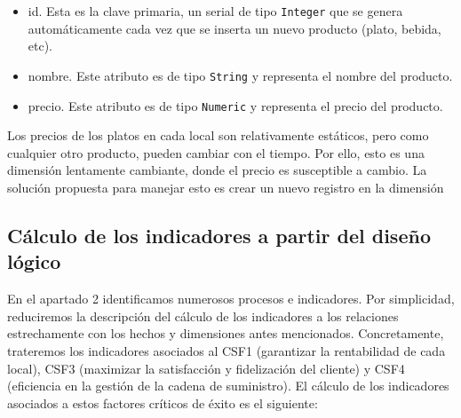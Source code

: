 \documentclass[12pt]{opticajnl}
\begin{document}
\begin{itemize}
\begin{itemize}
\item id. Esta es la clave primaria, un serial de tipo \texttt{Integer} que se genera automáticamente cada vez que se inserta un nuevo producto (plato, bebida, etc).
\item nombre. Este atributo es de tipo \texttt{String} y representa el nombre del producto.
\item precio. Este atributo es de tipo \texttt{Numeric} y representa el precio del producto.
\end{itemize}
Los precios de los platos en cada local son relativamente estáticos, pero como cualquier otro producto, pueden cambiar con el tiempo. Por ello, esto es una dimensión lentamente cambiante, donde el precio es susceptible a cambio. La solución propuesta para manejar esto es crear un nuevo registro en la dimensión
\end{itemize}


\subsection{Cálculo de los indicadores a partir del diseño lógico}

En el apartado 2 identificamos numerosos procesos e indicadores. Por simplicidad, reduciremos la descripción del cálculo de los indicadores a los relaciones estrechamente con los hechos y dimensiones antes mencionados. Concretamente, trateremos los indicadores asociados al CSF1 (garantizar la rentabilidad de cada local), CSF3 (maximizar la satisfacción y fidelización del cliente) y CSF4 (eficiencia en la gestión de la cadena de suministro). El cálculo de los indicadores asociados a estos factores críticos de éxito es el siguiente:
\end{document}
